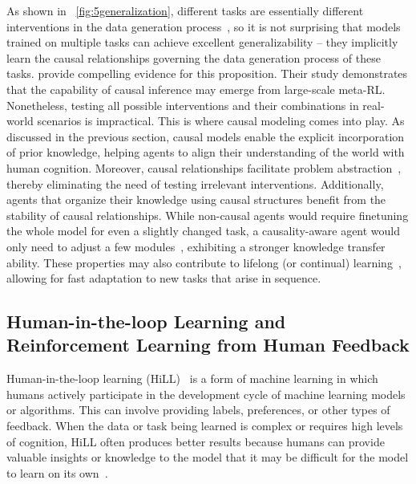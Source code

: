 \documentclass[10pt]{article} %
\theoremstyle{definition}
\begin{document}
As shown in \figurename~\ref{fig:5generalization}, different tasks are essentially different interventions in the data generation process~\citep{scholkopfCausalRepresentationLearning2021a}, so it is not surprising that models trained on multiple tasks can achieve excellent generalizability -- they implicitly learn the causal relationships governing the data generation process of these tasks. \citet{dasguptaCausalReasoningMetareinforcement2018} provide compelling evidence for this proposition. Their study demonstrates that the capability of causal inference may emerge from large-scale meta-RL. Nonetheless, testing all possible interventions and their combinations in real-world scenarios is impractical. This is where causal modeling comes into play. As discussed in the previous section, causal models enable the explicit incorporation of prior knowledge, helping agents to align their understanding of the world with human cognition. Moreover, causal relationships facilitate problem abstraction~\citep{wangCausalDynamicsLearning2022a}, thereby eliminating the need of testing irrelevant interventions. Additionally, agents that organize their knowledge using causal structures benefit from the stability of causal relationships. While non-causal agents would require finetuning the whole model for even a slightly changed task, a causality-aware agent would only need to adjust a few modules~\citep{huangAdaRLWhatWhere2022a}, exhibiting a stronger knowledge transfer ability. These properties may also contribute to lifelong (or continual) learning~\citep{xieLifelongRoboticReinforcement2022, khetarpalContinualReinforcementLearning2022}, allowing for fast adaptation to new tasks that arise in sequence.

\subsection{Human-in-the-loop Learning and Reinforcement Learning from Human Feedback}
\label{subsec:7.3HILL}

Human-in-the-loop learning (HiLL)~\citep{mosqueira-reyHumanintheloopMachineLearning2022} is a form of machine learning in which humans actively participate in the development cycle of machine learning models or algorithms. This can involve providing labels, preferences, or other types of feedback. When the data or task being learned is complex or requires high levels of cognition, HiLL often produces better results because humans can provide valuable insights or knowledge to the model that it may be difficult for the model to learn on its own~\citep{mosqueira-reyHumanintheloopMachineLearning2022,zhangCanHumansBe2022a}.
\end{document}
